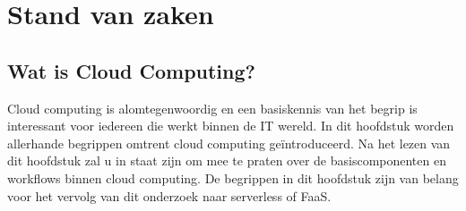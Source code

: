 \chapter{Stand van zaken}
\label{ch:stand-van-zaken}



%
%

\section{Wat is Cloud Computing?}
 
 Cloud computing is alomtegenwoordig en een basiskennis van het begrip is interessant voor iedereen die werkt binnen de IT wereld. In dit hoofdstuk worden allerhande begrippen omtrent cloud computing geïntroduceerd. Na het lezen van dit hoofdstuk zal u in staat zijn om mee te praten over de basiscomponenten en workflows binnen cloud computing. De begrippen in dit hoofdstuk zijn van belang voor het vervolg van dit onderzoek naar serverless of FaaS. 


